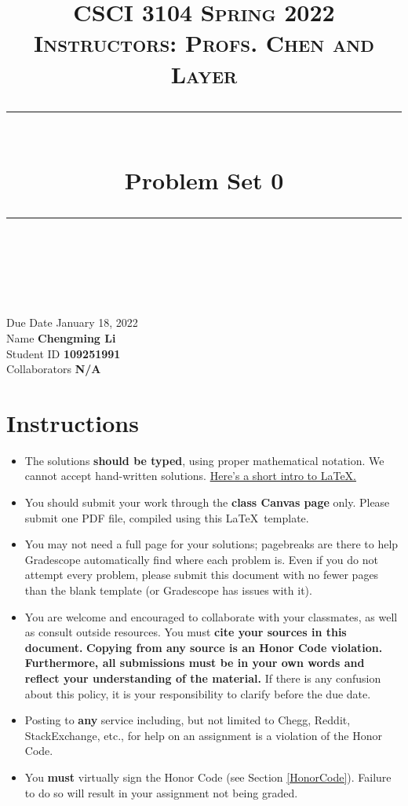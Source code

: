 \documentclass[11pt]{article}
\title{
\normalfont \normalsize 
\textsc{CSCI 3104 Spring 2022 \\ 
Instructors: Profs. Chen and Layer} \\
[10pt] 
\rule{\linewidth}{0.5pt} \\[6pt] 
\huge Problem Set 0 \\
\rule{\linewidth}{2pt}  \\[10pt]
}
\date{}
\theoremstyle{definition}
\theoremstyle{definition}
\theoremstyle{definition}
\begin{document}
\maketitle


\noindent
Due Date \dotfill January 18, 2022 \\
Name \dotfill \textbf{Chengming Li} \\
Student ID \dotfill \textbf{109251991} \\
Collaborators \dotfill \textbf{N/A}

\tableofcontents

\section{Instructions}
 \begin{itemize}
	\item The solutions \textbf{should be typed}, using proper mathematical notation. We cannot accept hand-written solutions. \href{http://ece.uprm.edu/~caceros/latex/introduction.pdf}{Here's a short intro to \LaTeX.}
	\item You should submit your work through the \textbf{class Canvas page} only. Please submit one PDF file, compiled using this \LaTeX \ template.
	\item You may not need a full page for your solutions; pagebreaks are there to help Gradescope automatically find where each problem is. Even if you do not attempt every problem, please submit this document with no fewer pages than the blank template (or Gradescope has issues with it).

	\item You are welcome and encouraged to collaborate with your classmates, as well as consult outside resources. You must \textbf{cite your sources in this document.} \textbf{Copying from any source is an Honor Code violation. Furthermore, all submissions must be in your own words and reflect your understanding of the material.} If there is any confusion about this policy, it is your responsibility to clarify before the due date. 

	\item Posting to \textbf{any} service including, but not limited to Chegg, Reddit, StackExchange, etc., for help on an assignment is a violation of the Honor Code.

	\item You \textbf{must} virtually sign the Honor Code (see Section \ref{HonorCode}). Failure to do so will result in your assignment not being graded.
\end{itemize}
\end{document}
